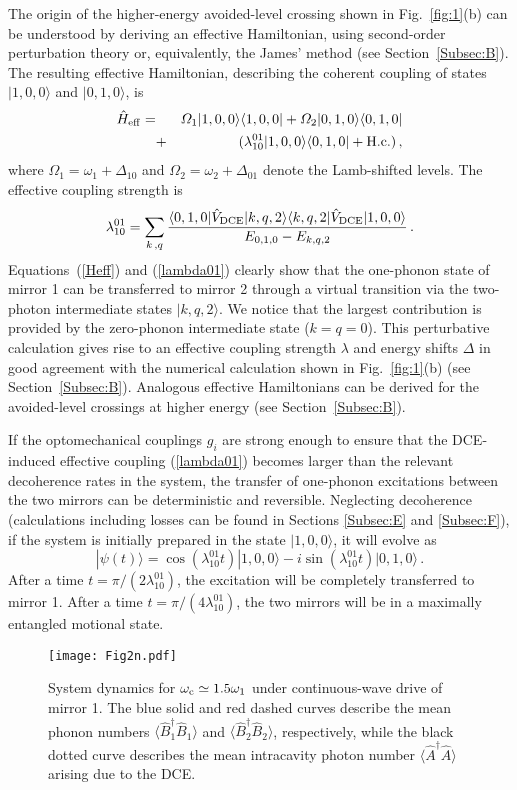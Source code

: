 \documentclass[aps,pra,twocolumn,floatfix,longbibliography, superscriptaddress]{revtex4-1}
\newcommand{\be}{\begin{equation}}
\newcommand{\ee}{\end{equation}}
\newcommand{\bea}{\begin{eqnarray}}
\newcommand{\eea}{\end{eqnarray}}
\begin{document}
The origin of the higher-energy avoided-level crossing shown in Fig.~\ref{fig:1}(b) can be understood by deriving an effective Hamiltonian, using second-order perturbation theory or, equivalently, the James' method \cite{Gamel2010, Shao2017} (see Section~\ref{Subsec:B}). The resulting effective Hamiltonian, describing the coherent coupling of states 
$|1,0,0 \rangle$ and $|0,1,0 \rangle$, is
\bea\label{Heff}
\hat H_{\rm eff} =&& \Omega_1 |1,0,0 \rangle \langle 1,0,0| +  \Omega_2 |0,1,0 \rangle \langle 0,1,0|\nonumber \\ &+&(\lambda^{01}_{10}  |1,0,0 \rangle \langle 0,1,0| + {\rm H.c.})\, ,
\eea
where $\Omega_1 = \omega_1 + \Delta_{10}$ and $\Omega_2 = \omega_2 + \Delta_{01}$  denote
 the Lamb-shifted levels. The effective coupling strength is 
\be\label{lambda01}
\lambda_{10}^{01}=\sum_{k\, , q}\frac{\langle 0,1,0| \hat V_{\rm DCE} | k,q,2 \rangle \langle k,q,2| \hat V_{\rm DCE} | 1,0,0 \rangle}{E_{0,1,0}- E_{k,q,2}}\, .
\ee	
Equations~(\ref{Heff}) and (\ref{lambda01}) clearly show that the one-phonon state of mirror 1 can be transferred to mirror 2 through a virtual transition via the two-photon intermediate states $| k,q,2 \rangle$. We notice that the largest contribution is provided by the zero-phonon intermediate state ($k=q =0$). This perturbative calculation gives rise to an effective coupling strength $\lambda$ and  energy shifts $\Delta$ in good agreement with the numerical calculation shown in Fig.~\ref{fig:1}(b) (see Section~\ref{Subsec:B}). 
Analogous effective Hamiltonians can be derived for the avoided-level crossings at higher energy (see Section~\ref{Subsec:B}).

If the optomechanical couplings $g_i$ are strong enough to ensure that the DCE-induced effective coupling 
(\ref{lambda01}) becomes larger than the relevant decoherence rates in the system, the transfer of  one-phonon excitations between the two mirrors can be deterministic and reversible. Neglecting decoherence (calculations including losses can be found in Sections \ref{Subsec:E} and \ref{Subsec:F}), if the system is initially prepared in the state $|1,0,0 \rangle$, it will evolve as
\be\label{free}
|\psi(t) \rangle = \cos (\lambda_{10}^{01} t) |1,0,0 \rangle -i \sin (\lambda_{10}^{01} t) |0,1,0 \rangle\, .
\ee
After a time $t = \pi / (2\lambda_{10}^{01})$, the excitation will be completely transferred to mirror 1.
After a time $t = \pi / (4 \lambda_{10}^{01})$, the two mirrors will be in a maximally entangled motional state.


\begin{figure}
	\centering
	\texttt{[image: Fig2n.pdf]}
	\caption{System dynamics for $\omega_{\rm c} \simeq 1.5 \omega_{1}$ under continuous-wave drive of  mirror 1. The blue solid and red dashed curves
		 describe   the mean phonon numbers $\langle \hat B_1^\dag \hat B_1^{} \rangle$ and $\langle \hat B_2^\dag \hat B_2^{} \rangle$, respectively, while the black dotted curve describes the mean intracavity photon number $\langle \hat A^\dag \hat A \rangle$ arising due to the DCE.
		\label{fig:2}}
\end{figure}
\end{document}

